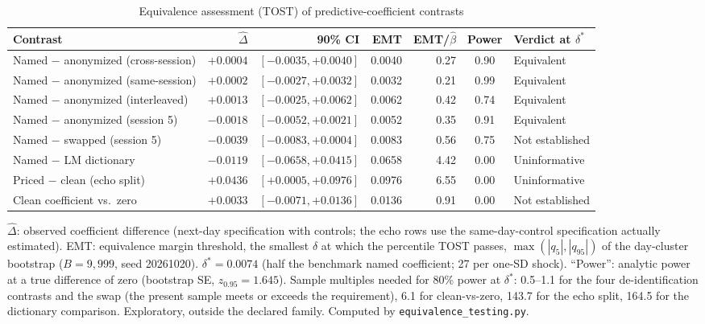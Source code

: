 \begin{table}[htbp]
\centering
\small
\caption{Equivalence assessment (TOST) of predictive-coefficient contrasts}
\label{tab:tost}
\begin{adjustbox}{max width=\textwidth}
\begin{tabular}{lrrrrcl}
\toprule
Contrast & $\widehat{\Delta}$ & 90\% CI & EMT & EMT/$\hat\beta$ & Power & Verdict at $\delta^{*}$ \\
\midrule
Named $-$ anonymized (cross-session) & $+0.0004$ & $[-0.0035, +0.0040]$ & 0.0040 & 0.27 & 0.90 & Equivalent \\
Named $-$ anonymized (same-session) & $+0.0002$ & $[-0.0027, +0.0032]$ & 0.0032 & 0.21 & 0.99 & Equivalent \\
Named $-$ anonymized (interleaved) & $+0.0013$ & $[-0.0025, +0.0062]$ & 0.0062 & 0.42 & 0.74 & Equivalent \\
Named $-$ anonymized (session 5) & $-0.0018$ & $[-0.0052, +0.0021]$ & 0.0052 & 0.35 & 0.91 & Equivalent \\
Named $-$ swapped (session 5) & $-0.0039$ & $[-0.0083, +0.0004]$ & 0.0083 & 0.56 & 0.75 & Not established \\
Named $-$ LM dictionary & $-0.0119$ & $[-0.0658, +0.0415]$ & 0.0658 & 4.42 & 0.00 & Uninformative \\
Priced $-$ clean (echo split) & $+0.0436$ & $[+0.0005, +0.0976]$ & 0.0976 & 6.55 & 0.00 & Uninformative \\
Clean coefficient vs.\ zero & $+0.0033$ & $[-0.0071, +0.0136]$ & 0.0136 & 0.91 & 0.00 & Not established \\
\bottomrule
\end{tabular}
\end{adjustbox}
\begin{tablenotes}[flushleft]\footnotesize
\item $\widehat{\Delta}$: observed coefficient difference (next-day specification with controls; the echo rows use the same-day-control specification actually estimated). EMT: equivalence margin threshold, the smallest $\delta$ at which the percentile TOST passes, $\max(|q_{5}|,|q_{95}|)$ of the day-cluster bootstrap ($B=9{,}999$, seed 20261020). $\delta^{*}=0.0074$ (half the benchmark named coefficient; 27 \bps{} per one-SD shock). ``Power'': analytic power at a true difference of zero (bootstrap SE, $z_{0.95}=1.645$). Sample multiples needed for 80\% power at $\delta^{*}$: 0.5--1.1 for the four de-identification contrasts and the swap (the present sample meets or exceeds the requirement), 6.1 for clean-vs-zero, 143.7 for the echo split, 164.5 for the dictionary comparison. Exploratory, outside the declared family. Computed by \texttt{equivalence\_testing.py}.
\end{tablenotes}
\end{table}

